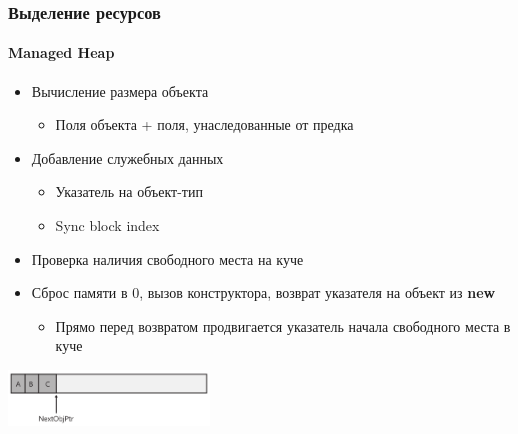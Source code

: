 \documentclass[xetex,mathserif,serif]{beamer}
\begin{document}
    \begin{frame}
        \frametitle{Выделение ресурсов}
        \framesubtitle{Managed Heap}
        \begin{itemize}
            \item Вычисление размера объекта
            \begin{itemize}
                \item Поля объекта + поля, унаследованные от предка
            \end{itemize}
            \item Добавление служебных данных
            \begin{itemize}
                \item Указатель на объект-тип
                \item Sync block index
            \end{itemize}
            \item Проверка наличия свободного места на куче
            \item Сброс памяти в 0, вызов конструктора, возврат указателя на объект из \textbf{new}
            \begin{itemize}
                \item Прямо перед возвратом продвигается указатель начала свободного места в куче
            \end{itemize}
        \end{itemize}
        \begin{center}
            \includegraphics[width=0.4\textwidth]{heapAllocation.png}
        \end{center}
    \end{frame}
\end{document}
